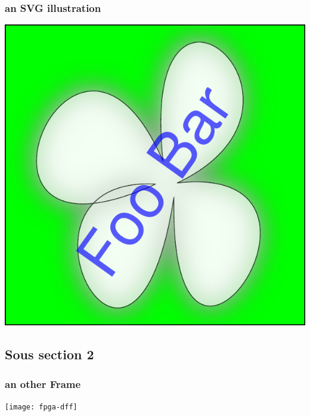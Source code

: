 \documentclass{beamer}
\begin{document}
\begin{frame}
   \frametitle{an SVG illustration}

\begin{center}
   \includegraphics[height=.8\textheight]{drawing}
\end{center}

\end{frame}
\subsection { Sous section 2}
\begin{frame}
\frametitle{an other Frame}

\begin{center}
  \texttt{[image: fpga-dff]}
\end{center}

\end{frame}
\end{document}
